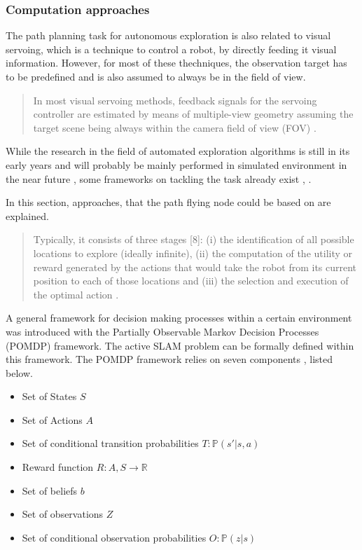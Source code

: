	\subsubsection{Computation approaches}
	
	The path planning task for autonomous exploration is also related to visual servoing, which is a technique to control a robot, by 
	directly feeding it visual information. However, for most of these thechniques, the observation target has to be predefined and is also assumed 
	to always be in the field of view. 
	
	\begin{quote}
	
	In most visual servoing methods, feedback signals for the servoing
	controller are estimated by means of multiple-view geometry assuming 
	the target scene being always within the camera field of view (FOV) \cite{servo}.
	
	\end{quote}
	
	While the research in the field of automated exploration algorithms is still in its early years \cite{early} and will probably be mainly performed 
	in simulated environment in the near future \cite{deep}, some frameworks on tackling the 
	task already exist \cite{early}, \cite{deep} \cite{accurat} \cite{lopez}. 
	
	In this section, approaches, that the path flying node could be based on are explained. 
	
	\begin{quote}
	Typically, it consists of three stages [8]: (i) the identification of all possible locations
to explore (ideally infinite), (ii) the computation of the utility or reward generated by the actions that
would take the robot from its current position to each of those locations and (iii) the selection and
execution of the optimal action \cite{deep}. 
\end{quote}

A general framework for decision making processes within a certain environment was introduced with the Partially Observable Markov Decision Processes (POMDP) framework. 
	The active SLAM problem can be formally defined within this framework. 
	The POMDP framework relies on seven components \cite{thesisvandenhof}, listed below. 
	
	\begin{itemize}
	\item{Set of States $S$}
	\item{Set of Actions $A$}
	\item{Set of conditional transition probabilities $T: \mathbb{P}(s'|s, a)$}
	\item{Reward function $R : A, S \rightarrow \mathbb{R}$}
	\item{Set of beliefs $b$}
	\item{Set of observations $Z$}
	\item{Set of conditional observation probabilities $O: \mathbb{P}(z|s)$}
	\end{itemize}
	
